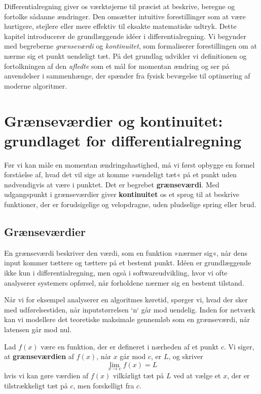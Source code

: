 Differentialregning giver os værktøjerne til præcist at beskrive, beregne og fortolke sådanne ændringer. Den omsætter intuitive forestillinger som at være hurtigere, stejlere eller mere effektiv til eksakte matematiske udtryk. Dette kapitel introducerer de grundlæggende idéer i differentialregning. Vi begynder med begreberne \emph{grænseværdi} og \emph{kontinuitet}, som formaliserer forestillingen om at nærme sig et punkt uendeligt tæt. På det grundlag udvikler vi definitionen og fortolkningen af den \emph{afledte} som et mål for momentan ændring og ser på anvendelser i sammenhænge, der spænder fra fysisk bevægelse til optimering af moderne algoritmer.


\section{Grænseværdier og kontinuitet: grundlaget for differentialregning}

Før vi kan måle en momentan ændringshastighed, må vi først opbygge en formel forståelse af, hvad det vil sige at komme »uendeligt tæt« på et punkt uden nødvendigvis at være i punktet. Det er begrebet \textbf{grænseværdi}. Med udgangspunkt i grænseværdier giver \textbf{kontinuitet} os et sprog til at beskrive funktioner, der er forudsigelige og velopdragne, uden pludselige spring eller brud.

\subsection*{Grænseværdier}

En grænseværdi beskriver den værdi, som en funktion »nærmer sig«, når dens input kommer tættere og tættere på et bestemt punkt. Idéen er grundlæggende ikke kun i differentialregning, men også i softwareudvikling, hvor vi ofte analyserer systemers opførsel, når forholdene nærmer sig en bestemt tilstand.

Når vi for eksempel analyserer en algoritmes køretid, spørger vi, hvad der sker med udførelsestiden, når inputstørrelsen `n` går mod uendelig. Inden for netværk kan vi modellere det teoretiske maksimale gennemløb som en grænseværdi, når latensen går mod nul.

\begin{definition}[Grænseværdi]
Lad \( f(x) \) være en funktion, der er defineret i nærheden af et punkt \( c \). Vi siger, at \textbf{grænseværdien} af \( f(x) \), når \( x \) går mod \( c \), er \( L \), og skriver
\vspace{0.5em}
\[
\lim_{x \to c} f(x) = L
\]
\vspace{0.5em}
hvis vi kan gøre værdien af \( f(x) \) vilkårligt tæt på \( L \) ved at vælge et \( x \), der er tilstrækkeligt tæt på \( c \), men forskelligt fra \( c \).
\end{definition}

